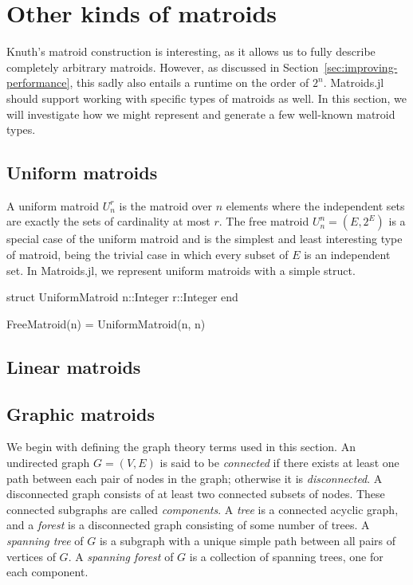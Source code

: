 \section{Other kinds of matroids}
Knuth's matroid construction is interesting, as it allows us to fully describe completely arbitrary matroids. However, as discussed in Section~\ref{sec:improving-performance}, this sadly also entails a runtime on the order of $2^n$. Matroids.jl should support working with specific types of matroids as well. In this section, we will investigate how we might represent and generate a few well-known matroid types.

\subsection{Uniform matroids}
A uniform matroid $U_n^r$ is the matroid over $n$ elements where the independent sets are exactly the sets of cardinality at most $r$. The free matroid $U_n^n = (E, 2^E)$ is a special case of the uniform matroid and is the simplest and least interesting type of matroid, being the trivial case in which every subset of $E$ is an independent set. In Matroids.jl, we represent uniform matroids with a simple struct.

\begin{jllisting}
struct UniformMatroid
  n::Integer
  r::Integer
end

FreeMatroid(n) = UniformMatroid(n, n)
\end{jllisting}

\subsection{Linear matroids}

\subsection{Graphic matroids}

We begin with defining the graph theory terms used in this section. An undirected graph $G=(V,E)$ is said to be \textit{connected} if there exists at least one path between each pair of nodes in the graph; otherwise it is \textit{disconnected}. A disconnected graph consists of at least two connected subsets of nodes. These connected subgraphs are called \textit{components}. A \textit{tree} is a connected acyclic graph, and a \textit{forest} is a disconnected graph consisting of some number of trees. A \textit{spanning tree} of $G$ is a subgraph with a unique simple path between all pairs of vertices of $G$. A \textit{spanning forest} of $G$ is a collection of spanning trees, one for each component.

